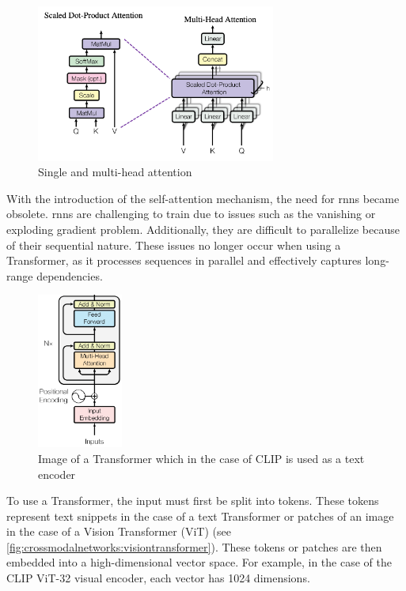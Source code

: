     \begin{figure}[]
        \centering
        \includegraphics[width=0.7\textwidth]{Images/crossmodalnetworks/attention.png}
        \caption{Single and multi-head attention\cite{attentionisallyouneed}}
        \label{fig:crossmodalnetworks:attention}
    \end{figure}

    With the introduction of the self-attention mechanism, the need for \acrshort{rnn}s became obsolete. 
    \acrshort{rnn}s are challenging to train due to issues such as the vanishing or exploding gradient problem. 
    Additionally, they are difficult to parallelize because of their sequential nature. 
    These issues no longer occur when using a Transformer, as it processes sequences in parallel and effectively captures long-range dependencies.


    \begin{figure}[]
        \centering
        \includegraphics[width=0.25\textwidth]{Images/crossmodalnetworks/The-Transformer-encoder-structure.png}
        \caption{Image of a Transformer which in the case of CLIP is used as a text encoder\cite{attentionisallyouneed}}
        \label{fig:crossmodalnetworks:transformer}
    \end{figure}

    To use a Transformer, the input must first be split into tokens. 
    These tokens represent text snippets in the case of a text Transformer or patches of an image in the case of a Vision Transformer (ViT) (see \cref{fig:crossmodalnetworks:visiontransformer}). 
    These tokens or patches are then embedded into a high-dimensional vector space. 
    For example, in the case of the CLIP ViT-32 visual encoder, each vector has 1024 dimensions.

